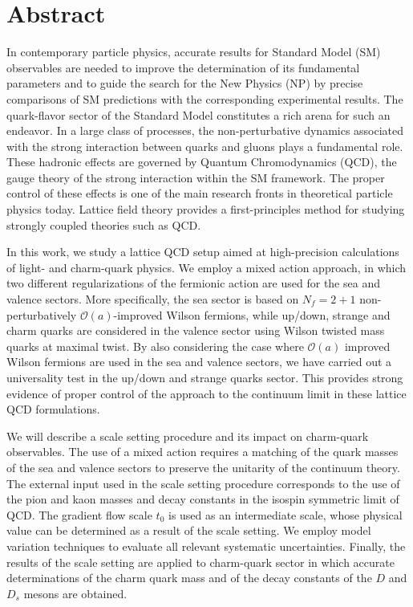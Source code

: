 \begingroup
\let\clearpage\relax
\let\cleardoublepage\relax
\let\cleardoublepage\relax

\chapter*{Abstract}

In contemporary particle physics, accurate results for Standard Model (SM) observables are needed to improve the determination of its fundamental parameters and to guide the search for the New Physics (NP) by precise comparisons of SM predictions with the corresponding  experimental results. The quark-flavor sector of the Standard Model constitutes a rich arena for such an endeavor. In a large class of processes, the non-perturbative dynamics associated with the strong interaction between quarks and gluons plays a fundamental role. These hadronic effects are governed by Quantum Chromodynamics (QCD), the gauge theory of the strong interaction within the SM framework. The proper control of these effects is one of the main research fronts in theoretical particle physics today. Lattice field theory provides a first-principles method for studying strongly coupled theories such as QCD.

In this work, we study a lattice QCD setup aimed at high-precision calculations of light- and charm-quark physics. We employ a mixed action approach, in which two different regularizations of the fermionic action are used for the sea and valence sectors. More specifically, the sea sector is based on $N_f = 2 + 1$ non-perturbatively $\mathcal{O}(a)$-improved Wilson fermions, while up/down, strange and charm quarks are considered in the valence sector using  Wilson twisted mass quarks at maximal twist. By also considering the case where $\mathcal{O}(a)$ improved Wilson fermions are used in the sea and valence sectors, we have carried out a universality test in the up/down and strange quarks sector. This provides strong evidence of proper control of the approach to the continuum limit in these lattice QCD formulations.

We will describe a scale setting procedure and its impact on charm-quark observables. The use of a mixed action requires a matching of the quark masses of the sea and valence sectors to preserve the unitarity of the continuum theory. The external input used in the scale setting procedure corresponds to the use of the pion and kaon masses and decay constants in the isospin symmetric limit of QCD. The gradient flow scale $t_0$ is used as an intermediate scale, whose physical value can  be determined as a result of the scale setting. We employ model variation techniques to evaluate all relevant systematic uncertainties. Finally, the results of the scale setting are applied to  charm-quark sector in which accurate determinations of the charm quark mass and of the decay constants of the $D$ and $D_s$ mesons are obtained. 

